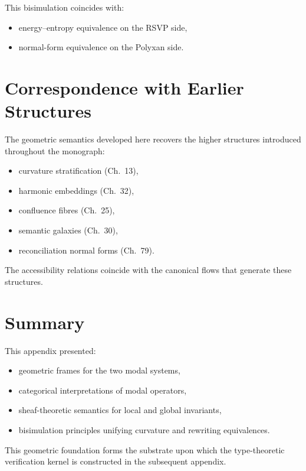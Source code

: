 This bisimulation coincides with:
\begin{itemize}
\item energy–entropy equivalence on the RSVP side,
\item normal-form equivalence on the Polyxan side.
\end{itemize}

\section{Correspondence with Earlier Structures}

The geometric semantics developed here recovers the higher structures introduced throughout the monograph:

\begin{itemize}
\item curvature stratification (Ch.~13),
\item harmonic embeddings (Ch.~32),
\item confluence fibres (Ch.~25),
\item semantic galaxies (Ch.~30),
\item reconciliation normal forms (Ch.~79).
\end{itemize}

The accessibility relations coincide with the canonical flows that generate these structures.

\section{Summary}

This appendix presented:

\begin{itemize}
\item geometric frames for the two modal systems,
\item categorical interpretations of modal operators,
\item sheaf-theoretic semantics for local and global invariants,
\item bisimulation principles unifying curvature and rewriting equivalences.
\end{itemize}

This geometric foundation forms the substrate upon which the type-theoretic verification kernel is constructed in the subsequent appendix.

